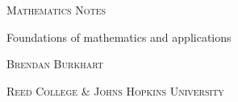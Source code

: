 \begin{titlingpage}
    \centering
    \vspace*{1cm}
    {\scshape\Huge Mathematics Notes \par}
    \vspace{1cm}
    {\LARGE Foundations of mathematics and applications \par}
    \vfill
    \vfill
    \begin{tikzpicture}
        
    \end{tikzpicture}
    \vfill
    \vfill
    \vfill
    {\scshape\large Brendan Burkhart \par}
    \vspace{0.5cm}
    {\scshape Reed College \& Johns Hopkins University \par}
    \vspace{0.5cm}
    {\scshape \number\year \par}
    \vfill
\end{titlingpage}
